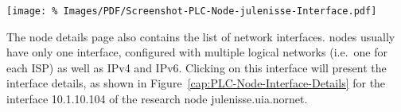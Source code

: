 \begin{figure*}
\begin{center}
\texttt{[image: \%
   Images/PDF/Screenshot-PLC-Node-julenisse-Interface.pdf]}
\end{center}
\caption{Nodes $\rightarrow$ Node julenisse.uia.nornet $\rightarrow$ Interface~10.1.7.100}
\label{cap:PLC-Node-Interface-Details}
\end{figure*}

The node details page also contains the list of network interfaces.  nodes usually have only one interface, configured with multiple logical networks (i.e.\ one for each ISP) as well as IPv4 and IPv6. Clicking on this interface will present the interface details, as shown in Figure~\ref{cap:PLC-Node-Interface-Details} for the interface 10.1.10.104 of the research node julenisse.uia.nornet.

